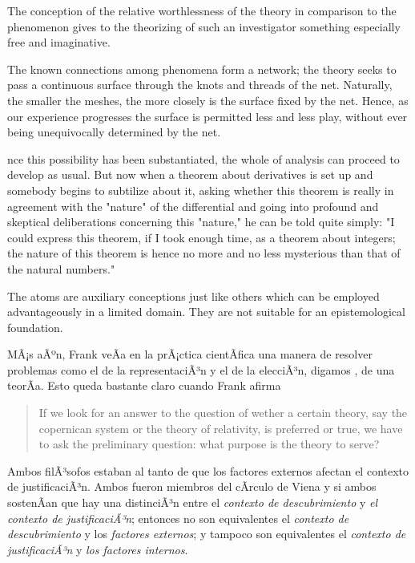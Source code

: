The conception of the relative worthlessness of the theory in  comparison to the phenomenon gives to the theorizing  of such an investigator something especially free and  imaginative.

The known connections among  phenomena form a network; the theory seeks to pass  a continuous surface through the knots and threads  of the net. Naturally, the smaller the meshes, the  more closely is the surface fixed by the net. Hence,  as our experience progresses the surface is permitted  less and less play, without ever being unequivocally  determined by the net.

nce this possibility has been substantiated,  the whole of analysis can proceed to develop as usual.  But now when a theorem about derivatives is set up  and somebody begins to subtilize about it, asking  whether this theorem is really in agreement with the  "nature" of the differential and going into profound  and skeptical deliberations concerning this "nature,"  he can be told quite simply: "I could express this  theorem, if I took enough time, as a theorem about  integers; the nature of this theorem is hence no more  and no less mysterious than that of the natural  numbers."

The  atoms are auxiliary conceptions just like others which  can be employed advantageously in a limited domain.  They are not suitable for an epistemological foundation.

MÃ¡s aÃºn, Frank veÃ­a en la prÃ¡ctica cientÃ­fica una manera de resolver problemas como el de la representaciÃ³n y el de la elecciÃ³n, digamos , de una teorÃ­a.
Esto queda bastante claro cuando Frank afirma

	\begin{quote}
	
	If we look for an answer to the question of wether a certain theory, say
	the copernican system or the theory of relativity, is preferred or true,
	we have to ask the preliminary question: what purpose is the theory to
	serve? \parencite[p. 15]{Frank1954} 

	\end{quote}

Ambos filÃ³sofos estaban al tanto de que los factores externos afectan el contexto de justificaciÃ³n.
Ambos fueron miembros del cÃ­rculo de Viena y si ambos sostenÃ­an que hay una distinciÃ³n entre el \emph{contexto de descubrimiento} y \emph{el contexto de justificaciÃ³n}; entonces no son equivalentes el \emph{contexto de descubrimiento} y los \emph{factores externos}; y  tampoco son equivalentes el \emph{contexto de justificaciÃ³n} y \emph{los factores internos}.

